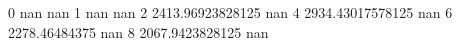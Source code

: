 0 nan nan
1 nan nan
2 2413.96923828125 nan
4 2934.43017578125 nan
6 2278.46484375 nan
8 2067.9423828125 nan
